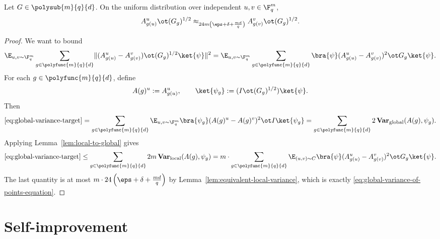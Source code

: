 \begin{lemma}\label{lem:global-variance-of-points}
	\leanok
	Let $G \in \polysub{m}{q}{d}$. On the uniform distribution over independent $u,v \in \F_q^m$,
	\begin{equation}
		A^u_{g(u)} \ot (G_g)^{1/2}
		\approx_{24m\left(\eps+\delta+\frac{md}{q}\right)}
		A^v_{g(v)} \ot (G_g)^{1/2}.
		\label{eq:global-variance-of-points-equation}
	\end{equation}
\end{lemma}
\begin{proof}
	\leanok
	We want to bound
	\begin{equation}
		\E_{u,v \sim \F_q^m} \sum_{g \in \polyfunc{m}{q}{d}} \lVert (A^u_{g(u)}-A^v_{g(v)}) \ot (G_g)^{1/2} \ket{\psi} \rVert^2
		=
		\E_{u,v \sim \F_q^m} \sum_{g \in \polyfunc{m}{q}{d}} \bra{\psi} (A^u_{g(u)}-A^v_{g(v)})^2 \ot G_g \ket{\psi}.
		\label{eq:global-variance-target}
	\end{equation}
	For each $g \in \polyfunc{m}{q}{d}$, define
	\[
		A(g)^u := A^u_{g(u)},
		\qquad
		\ket{\psi_g} := (I \ot (G_g)^{1/2})\ket{\psi}.
	\]
	Then
	\[
		\eqref{eq:global-variance-target}
		=
		\sum_{g \in \polyfunc{m}{q}{d}} \E_{u,v \sim \F_q^m} \bra{\psi_g} (A(g)^u-A(g)^v)^2 \ot I \ket{\psi_g}
		=
		\sum_{g \in \polyfunc{m}{q}{d}} 2\,\mathbf{Var}_{\mathrm{global}}(A(g),\psi_g).
	\]
	Applying Lemma~\ref{lem:local-to-global} gives
	\[
		\eqref{eq:global-variance-target}
		\le
		\sum_{g \in \polyfunc{m}{q}{d}} 2m\,\mathbf{Var}_{\mathrm{local}}(A(g),\psi_g)
		=
		m \cdot \sum_{g \in \polyfunc{m}{q}{d}} \E_{(u,v)\sim C} \bra{\psi} (A^u_{g(u)}-A^v_{g(v)})^2 \ot G_g \ket{\psi}.
	\]
	The last quantity is at most $m \cdot 24\left(\eps+\delta+\frac{md}{q}\right)$ by Lemma~\ref{lem:equivalent-local-variance}, which is exactly \ref{eq:global-variance-of-points-equation}.
\end{proof}


\chapter{Self-improvement}
\label{chap:self-improvement}

